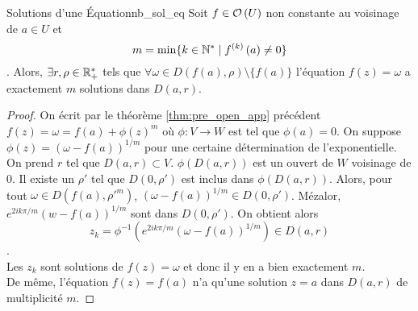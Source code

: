 \documentclass{cours}
\begin{document}
\begin{corollaire}{Solutions d'une Équation}{nb_sol_eq}
    Soit $f\in \mathcal{O}\left(U\right)$ non constante au voisinage de $a \in U$ et \begin{equation*}m = \min\{k \in \mathbb{N}^{*}\mid f^{\left(k\right)}\left(a\right) \neq 0\}\end{equation*}. Alors, $\exists r,\rho \in \mathbb{R}_{+}^{*}$ tels que $\forall \omega \in D\left(f\left(a\right), \rho\right) \setminus \{f\left(a\right)\}$ l'équation $f\left(z\right) = \omega$ a exactement $m$ solutions dans $D\left(a, r\right)$.
\end{corollaire}
\begin{proof}
    On écrit par le théorème \ref{thm:pre_open_app} précédent $f\left(z\right) = \omega = f\left(a\right) + \phi\left(z\right)^{m}$ où $\phi : V \to W$ est tel que $\phi\left(a\right) = 0$. On suppose $\phi\left(z\right) = \left(\omega - f\left(a\right)\right)^{1/m}$ pour une certaine détermination de l'exponentielle. 
    On prend $r$ tel que $D\left(a, r\right) \subset V$. $\phi\left(D\left(a, r\right)\right)$ est un ouvert de $W$ voisinage de $0$. Il existe un $\rho'$ tel que $D\left(0, \rho'\right)$ est inclus dans $\phi\left(D\left(a, r\right)\right)$. 
    Alors, pour tout $\omega \in D\left(f\left(a\right), \rho'^{m}\right)$, $\left(\omega - f\left(a\right)\right)^{1/m} \in D\left(0, \rho'\right)$. Mézalor, $e^{2ik\pi/m}\left(w -f\left(a\right)\right)^{1/m}$ sont dans $D\left(0, \rho'\right)$.
    On obtient alors \begin{equation*}z_{k} = \phi^{-1}\left(e^{2ik\pi/m}\left(\omega - f\left(a\right)\right)^{1/m}\right) \in D\left(a, r\right)\end{equation*}.\\
    Les $z_{k}$ sont solutions de $f\left(z\right) = \omega$ et donc il y en a bien exactement $m$. \\
    De même, l'équation $f\left(z\right) = f\left(a\right)$ n'a qu'une solution $z = a$ dans $D\left(a, r\right)$ de multiplicité $m$.
\end{proof}
\end{document}
